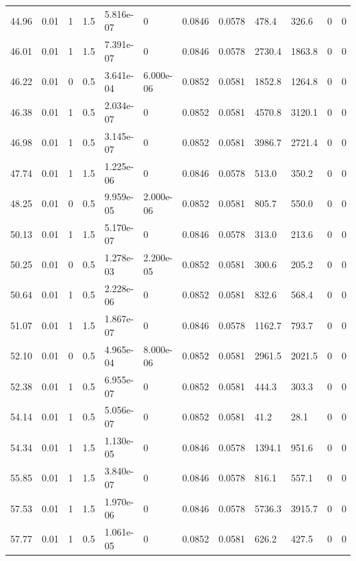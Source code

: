 \documentclass[preview]{standalone}
\begin{document}
{{{\begin{tabular}{L{1.2cm}C{1.2cm} C{0.3cm}C{0.5cm} C{1.4cm}C{1.4cm} C{1.4cm}C{1.4cm} C{1.6cm}C{1.6cm} C{1.6cm}C{1.6cm}}
  44.96  &  0.01  & 1     & 1.5 &  5.816e-07  & 0  &  0.0846&   0.0578& 478.4 & 326.6   &  0 & 0  \\ 
  46.01  &  0.01  & 1     & 1.5 &  7.391e-07  & 0  &  0.0846&   0.0578& 2730.4 & 1863.8   &  0 & 0  \\ 
  46.22  &  0.01  & 0     & 0.5 &  3.641e-04  & 6.000e-06  &  0.0852&   0.0581& 1852.8 & 1264.8   &  0 & 0  \\ 
  46.38  &  0.01  & 1     & 0.5 &  2.034e-07  & 0  &  0.0852&   0.0581& 4570.8 & 3120.1   &  0 & 0  \\ 
  46.98  &  0.01  & 1     & 0.5 &  3.145e-07  & 0  &  0.0852&   0.0581& 3986.7 & 2721.4   &  0 & 0  \\ 
  47.74  &  0.01  & 1     & 1.5 &  1.225e-06  & 0  &  0.0846&   0.0578& 513.0 & 350.2   &  0 & 0  \\ 
  48.25  &  0.01  & 0     & 0.5 &  9.959e-05  & 2.000e-06  &  0.0852&   0.0581& 805.7 & 550.0   &  0 & 0  \\ 
  50.13  &  0.01  & 1     & 1.5 &  5.170e-07  & 0  &  0.0846&   0.0578& 313.0 & 213.6   &  0 & 0  \\ 
  50.25  &  0.01  & 0     & 0.5 &  1.278e-03  & 2.200e-05  &  0.0852&   0.0581& 300.6 & 205.2   &  0 & 0  \\ 
  50.64  &  0.01  & 1     & 0.5 &  2.228e-06  & 0  &  0.0852&   0.0581& 832.6 & 568.4   &  0 & 0  \\ 
  51.07  &  0.01  & 1     & 1.5 &  1.867e-07  & 0  &  0.0846&   0.0578& 1162.7 & 793.7   &  0 & 0  \\ 
  52.10  &  0.01  & 0     & 0.5 &  4.965e-04  & 8.000e-06  &  0.0852&   0.0581& 2961.5 & 2021.5   &  0 & 0  \\ 
  52.38  &  0.01  & 1     & 0.5 &  6.955e-07  & 0  &  0.0852&   0.0581& 444.3 & 303.3   &  0 & 0  \\ 
  54.14  &  0.01  & 1     & 0.5 &  5.056e-07  & 0  &  0.0852&   0.0581& 41.2 & 28.1   &  0 & 0  \\ 
  54.34  &  0.01  & 1     & 1.5 &  1.130e-05  & 0  &  0.0846&   0.0578& 1394.1 & 951.6   &  0 & 0  \\ 
  55.85  &  0.01  & 1     & 1.5 &  3.840e-07  & 0  &  0.0846&   0.0578& 816.1 & 557.1   &  0 & 0  \\ 
  57.53  &  0.01  & 1     & 1.5 &  1.970e-06  & 0  &  0.0846&   0.0578& 5736.3 & 3915.7   &  0 & 0  \\ 
  57.77  &  0.01  & 1     & 0.5 &  1.061e-05  & 0  &  0.0852&   0.0581& 626.2 & 427.5   &  0 & 0  \\ 

\end{tabular}}}}
\end{document}
